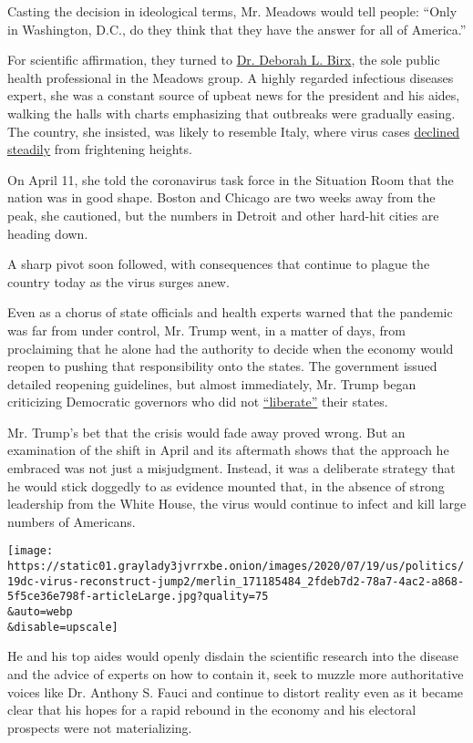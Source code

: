 Casting the decision in ideological terms, Mr. Meadows would tell
people: ``Only in Washington, D.C., do they think that they have the
answer for all of America.''

For scientific affirmation, they turned to
\href{https://www.state.gov/biographies/deborah-l-birx-md/}{Dr. Deborah
L. Birx}, the sole public health professional in the Meadows group. A
highly regarded infectious diseases expert, she was a constant source of
upbeat news for the president and his aides, walking the halls with
charts emphasizing that outbreaks were gradually easing. The country,
she insisted, was likely to resemble Italy, where virus cases
\href{https://www.nytimes3xbfgragh.onion/interactive/2020/world/europe/italy-coronavirus-cases.html}{declined
steadily} from frightening heights.

On April 11, she told the coronavirus task force in the Situation Room
that the nation was in good shape. Boston and Chicago are two weeks away
from the peak, she cautioned, but the numbers in Detroit and other
hard-hit cities are heading down.

A sharp pivot soon followed, with consequences that continue to plague
the country today as the virus surges anew.

Even as a chorus of state officials and health experts warned that the
pandemic was far from under control, Mr. Trump went, in a matter of
days, from proclaiming that he alone had the authority to decide when
the economy would reopen to pushing that responsibility onto the states.
The government issued detailed reopening guidelines, but almost
immediately, Mr. Trump began criticizing Democratic governors who did
not
\href{https://twitter.com/realDonaldTrump/status/1251169217531056130?s=20}{``liberate''}
their states.

Mr. Trump's bet that the crisis would fade away proved wrong. But an
examination of the shift in April and its aftermath shows that the
approach he embraced was not just a misjudgment. Instead, it was a
deliberate strategy that he would stick doggedly to as evidence mounted
that, in the absence of strong leadership from the White House, the
virus would continue to infect and kill large numbers of Americans.

\texttt{[image: https://static01.graylady3jvrrxbe.onion/images/2020/07/19/us/politics/19dc-virus-reconstruct-jump2/merlin\_171185484\_2fdeb7d2-78a7-4ac2-a868-5f5ce36e798f-articleLarge.jpg?quality=75\\\&auto=webp\\\&disable=upscale]}

He and his top aides would openly disdain the scientific research into
the disease and the advice of experts on how to contain it, seek to
muzzle more authoritative voices like Dr. Anthony S. Fauci and continue
to distort reality even as it became clear that his hopes for a rapid
rebound in the economy and his electoral prospects were not
materializing.

